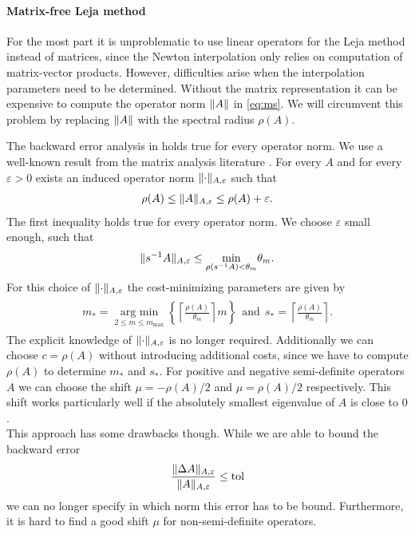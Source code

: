 \documentclass{scrartcl}
\begin{document}
	\paragraph{Matrix-free Leja method}
	For the most part it is unproblematic to use linear operators for the Leja method instead of matrices, since the Newton interpolation only relies on computation of matrix-vector products. However, difficulties arise when the interpolation parameters need to be determined. Without the matrix representation it can be expensive to compute the operator norm $\lVert A\rVert$ in \eqref{eq:ms}. We will circumvent this problem by replacing $\lVert A\rVert$ with the spectral radius $\rho(A)$. 
	
	The backward error analysis in \cite{lejarev} holds true for every operator norm.
	We use a well-known result from the matrix analysis literature \cite[Lemma 5.6.10.]{matrixanalysis}. For every $A$ and for every $\varepsilon>0$ exists an induced operator norm $\lVert\cdot\rVert_{A,\varepsilon}$ such that
	\[
	\rho(A) \le \lVert A\rVert_{A,\varepsilon} \le \rho(A) + \varepsilon. 
	\]
	The first inequality holds true for every operator norm. We choose $\varepsilon$ small enough, such that
	\[
	\lVert s^{-1}A\rVert_{A,\varepsilon} \le \underset{\rho(s^{-1}A) < \theta_m}{\min}\theta_m.
	\]
	For this choice of $\lVert\cdot\rVert_{A,\varepsilon}$ the cost-minimizing parameters are given by
	\begin{align}
	\begin{split}
	m_* = \underset{2\le m\le m_{\operatorname{max}}}{\operatorname{arg\ min}}  \left\{{\left\lceil{\frac{\rho(A)}{\theta_m}}\right\rceil}m\right\} ~~\text{and}~~
	s_* =  \left\lceil{\frac{\rho(A)}{\theta_m}}\right\rceil.
	\end{split}\label{eq:msmatrixfree}
	\end{align}
	The explicit knowledge of $\lVert\cdot\rVert_{A,\varepsilon}$ is no longer required. Additionally we can choose $c=\rho(A)$ without introducing additional costs, since we have to compute $\rho(A)$ to determine $m_*$ and $s_*$. 
	For positive and negative semi-definite operators $A$ we can choose the shift $\mu = -\rho(A)/2$ and $\mu = \rho(A)/2$ respectively. This shift works particularly well if the absolutely smallest eigenvalue of $A$ is close to $0$.\\
	This approach has some drawbacks though. While we are able to bound the backward error
	\[
	\frac{\lVert\Delta A\rVert_{A,\varepsilon}}{\lVert A\rVert_{A,\varepsilon}} \le \operatorname{tol}  
	\]
	we can no longer specify in which norm this error has to be bound. Furthermore, it is hard to find a good shift $\mu$ for non-semi-definite operators.
\end{document}
